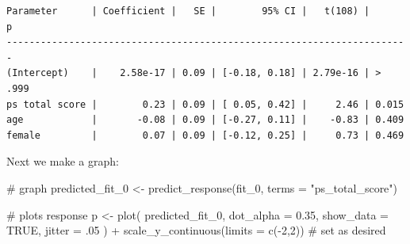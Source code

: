\documentclass[
  single column]{article}
\newenvironment{Shaded}{\begin{snugshade}}{\end{snugshade}}
\newcommand{\AttributeTok}[1]{\textcolor[rgb]{0.40,0.45,0.13}{#1}}
\newcommand{\CommentTok}[1]{\textcolor[rgb]{0.37,0.37,0.37}{#1}}
\newcommand{\ConstantTok}[1]{\textcolor[rgb]{0.56,0.35,0.01}{#1}}
\newcommand{\DecValTok}[1]{\textcolor[rgb]{0.68,0.00,0.00}{#1}}
\newcommand{\FloatTok}[1]{\textcolor[rgb]{0.68,0.00,0.00}{#1}}
\newcommand{\FunctionTok}[1]{\textcolor[rgb]{0.28,0.35,0.67}{#1}}
\newcommand{\NormalTok}[1]{\textcolor[rgb]{0.00,0.23,0.31}{#1}}
\newcommand{\OtherTok}[1]{\textcolor[rgb]{0.00,0.23,0.31}{#1}}
\newcommand{\SpecialCharTok}[1]{\textcolor[rgb]{0.37,0.37,0.37}{#1}}
\newcommand{\StringTok}[1]{\textcolor[rgb]{0.13,0.47,0.30}{#1}}
\begin{document}
\begin{verbatim}
Parameter      | Coefficient |   SE |        95% CI |   t(108) |      p
-----------------------------------------------------------------------
(Intercept)    |    2.58e-17 | 0.09 | [-0.18, 0.18] | 2.79e-16 | > .999
ps total score |        0.23 | 0.09 | [ 0.05, 0.42] |     2.46 | 0.015 
age            |       -0.08 | 0.09 | [-0.27, 0.11] |    -0.83 | 0.409 
female         |        0.07 | 0.09 | [-0.12, 0.25] |     0.73 | 0.469 
\end{verbatim}

Next we make a graph:

\begin{Shaded}
\begin{Highlighting}[]
\CommentTok{\# graph}
\NormalTok{predicted\_fit\_0 }\OtherTok{\textless{}{-}} \FunctionTok{predict\_response}\NormalTok{(fit\_0, }\AttributeTok{terms =} \StringTok{"ps\_total\_score"}\NormalTok{)}


\CommentTok{\# plots response}
\NormalTok{p }\OtherTok{\textless{}{-}} \FunctionTok{plot}\NormalTok{( }
\NormalTok{  predicted\_fit\_0, }
  \AttributeTok{dot\_alpha =} \FloatTok{0.35}\NormalTok{,}
  \AttributeTok{show\_data =} \ConstantTok{TRUE}\NormalTok{,}
  \AttributeTok{jitter =}\NormalTok{ .}\DecValTok{05}
\NormalTok{  )  }\SpecialCharTok{+}  \FunctionTok{scale\_y\_continuous}\NormalTok{(}\AttributeTok{limits =} \FunctionTok{c}\NormalTok{(}\SpecialCharTok{{-}}\DecValTok{2}\NormalTok{,}\DecValTok{2}\NormalTok{)) }\CommentTok{\# set as desired}
\end{Highlighting}
\end{Shaded}
\end{document}
